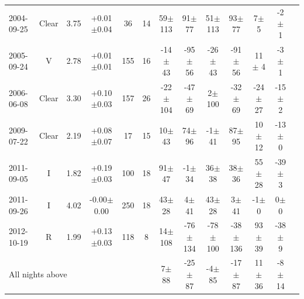\documentclass[12pt,a4paper]{report}
\begin{document}
\begin{landscape}
\begin{longtable}{|l|c|c|c|c|c|c|c|c|c|c|c|c|}
2004-09-25 & Clear & 3.75 & +0.01$\pm$0.04 &  36 &  14 &   59$\pm$113 &   91$\pm$ 77 &   51$\pm$113 &   93$\pm$ 77 &    7$\pm$  5 &   -2$\pm$  1 \\ 
2005-09-24 & V     & 2.78 & +0.01$\pm$0.01 & 155 &  16 &  -14$\pm$ 43 &  -95$\pm$ 56 &  -26$\pm$ 43 &  -91$\pm$ 56 &   11$\pm$  4 &   -3$\pm$  1 \\ 
2006-06-08 & Clear & 3.30 & +0.10$\pm$0.03 & 157 &  26 &  -22$\pm$104 &  -47$\pm$ 69 &    2$\pm$100 &  -32$\pm$ 69 &  -24$\pm$ 27 &  -15$\pm$  2 \\ 
2009-07-22 & Clear & 2.19 & +0.08$\pm$0.07 &  17 &  15 &   10$\pm$ 43 &   74$\pm$ 96 &   -1$\pm$ 41 &   87$\pm$ 95 &   10$\pm$ 12 &  -13$\pm$  0 \\ 
2011-09-05 & I     & 1.82 & +0.19$\pm$0.03 & 100 &  18 &   91$\pm$ 47 &   -1$\pm$ 34 &   36$\pm$ 38 &   38$\pm$ 36 &   55$\pm$ 28 &  -39$\pm$  3 \\ 
2011-09-26 & I     & 4.02 & -0.00$\pm$0.00 & 250 &  18 &   43$\pm$ 28 &    4$\pm$ 41 &   43$\pm$ 28 &    3$\pm$ 41 &   -1$\pm$  0 &    0$\pm$  0 \\ 
2012-10-19 & R     & 1.99 & +0.13$\pm$0.03 & 118 &   8 &   14$\pm$108 &  -76$\pm$134 &  -78$\pm$100 &  -38$\pm$136 &   93$\pm$ 39 &  -38$\pm$  9 \\ 
\hline
\multicolumn{6}{|l|}{All nights above} & 7$\pm$ 88 &  -25$\pm$ 87 &   -4$\pm$ 85 &  -17$\pm$ 87 &   11$\pm$ 36 &   -8$\pm$ 14 \\
\hline
\end{longtable}


\end{landscape}
\end{document}
